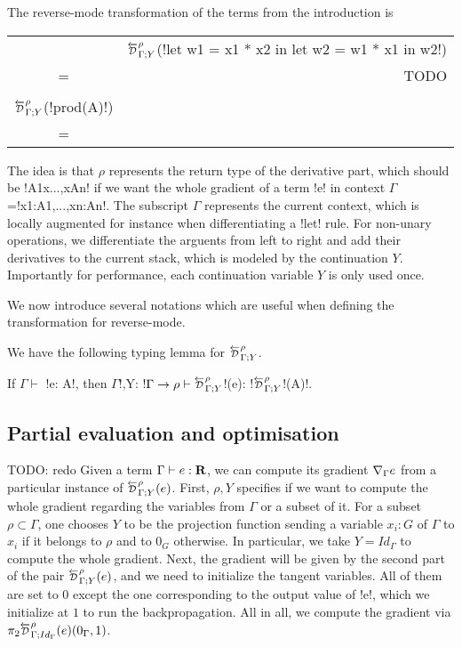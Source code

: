 \begin{example}
    The reverse-mode transformation of the terms from the introduction is

    \begin{tabular}{c r}
        &$\directD{\rho}{\Gamma}{Y}$(!let w1 = x1 * x2 in let w2 = w1 * x1 in w2!) \\
        =& TODO \\
        \\
        $\directD{\rho}{\Gamma}{Y}$(!prod(A)!) \\
        =& \\
    \end{tabular}
\end{example}

The idea is that $\rho$ represents the return type of the derivative part, which should be !A1x...,xAn! 
if we want the whole gradient of a term !e! in context $\Gamma$=!x1:A1,...,xn:An!.
The subscript $\Gamma$ represents the current context, 
which is locally augmented for instance when differentiating a !let! rule.
For non-unary operations, we differentiate the arguents from left to right and add their derivatives to the current stack, 
which is modeled by the continuation $Y$. 
Importantly for performance, each continuation variable $Y$ is only used once.

We now introduce several notations which are useful when defining the transformation for reverse-mode.



We have the following typing lemma for $\directD{\rho}{\Gamma}{Y}$.
\begin{lemma}
    If $\Gamma \vdash$ !e: A!, then $\Gamma$!,Y: !$\Gamma\to \rho \vdash \directD{\rho}{\Gamma}{Y}$!(e): !$\directD{\rho}{\Gamma}{Y}$!(A)!.
\end{lemma}



\subsection{Partial evaluation and optimisation} %
\label{sub:Partial evaluation and optimisation}

TODO: redo
Given a term $\Gamma\vdash e : \mathbf{R}$, we can compute its gradient $\nabla_\Gamma e$ from a particular instance of 
$\directD{\rho}{\Gamma}{Y}(e)$. First, $\rho, Y$ specifies if we want to compute the whole gradient regarding the variables from $\Gamma$ or a subset of it.
For a subset $\rho\subset \Gamma$, one chooses $Y$ to be the projection function sending a variable 
$x_i:G$ of $\Gamma$ to $x_i$ if it belongs to $\rho$ and to $0_G$ otherwise.
In particular, we take $Y=Id_\Gamma$ to compute the whole gradient.
Next, the gradient will be given by the second part of the pair $\directD{\rho}{\Gamma}{Y}(e)$, 
and we need to initialize the tangent variables. All of them are set to $0$ except the one corresponding to the output value of !e!, 
which we initialize at $1$ to run the backpropagation. 
All in all, we compute the gradient via $\pi_2\directD{\rho}{\Gamma}{Id_\Gamma}(e)(0_\Gamma,1)$.

